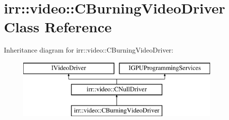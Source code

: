 \hypertarget{classirr_1_1video_1_1_c_burning_video_driver}{\section{irr\-:\-:video\-:\-:C\-Burning\-Video\-Driver Class Reference}
\label{classirr_1_1video_1_1_c_burning_video_driver}
}
Inheritance diagram for irr\-:\-:video\-:\-:C\-Burning\-Video\-Driver\-:\begin{figure}[H]
\begin{center}
\leavevmode
\includegraphics[height=3.000000cm]{classirr_1_1video_1_1_c_burning_video_driver}
\end{center}
\end{figure}
